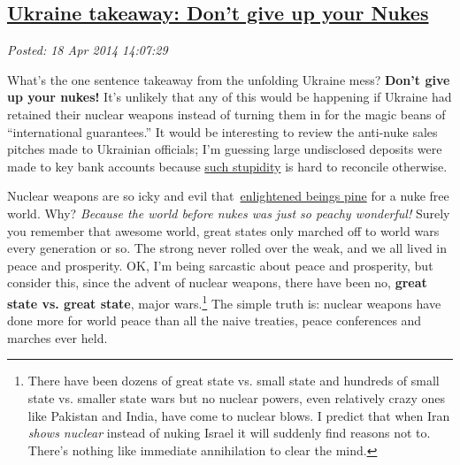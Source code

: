 %

\subsection*{\href{http://bakerjd99.wordpress.com/2014/04/18/ukraine-takeaway-dont-give-up-your-nukes/}{Ukraine takeaway: Don't give up your Nukes}}


\noindent\emph{Posted: 18 Apr 2014 14:07:29}
\vspace{6pt}

What's the one sentence takeaway from the unfolding Ukraine mess?
\textbf{Don't give up your nukes!} It's unlikely that any of
this would be happening if Ukraine had retained their nuclear weapons
instead of turning them in for the magic beans of ``international
guarantees.'' It would be interesting to review the anti-nuke sales
pitches made to Ukrainian officials; I'm guessing large undisclosed
deposits were made to key bank accounts because
\href{http://www.slate.com/blogs/the\_world\_/2014/03/19/the\_budapest\_memorandum\_in\_1994\_russia\_agreed\_to\_respect\_ukraine\_s\_borders.html}{such
stupidity} is hard to reconcile otherwise.

Nuclear weapons are so icky and evil
that~\href{http://blogs.telegraph.co.uk/news/nilegardiner/100002371/is-obama-the-most-naive-president-in-us-history/}{enlightened
beings pine} for a nuke free world. Why? \emph{Because the world before
nukes was just so peachy wonderful!} Surely you remember that awesome
world, great states only marched off to world wars every generation or
so. The strong never rolled over the weak, and we all lived in peace and
prosperity. OK, I'm being sarcastic about peace and prosperity, but
consider this, since the advent of nuclear weapons, there have been no,
\textbf{great state vs. great state}, major wars.\footnote{
There have been dozens of great state vs. small state and
hundreds of small state vs. smaller state wars but no nuclear powers,
even relatively crazy ones like Pakistan and India, have come to nuclear
blows. I predict that when Iran \emph{shows nuclear} instead of nuking
Israel it will suddenly find reasons not to. There's nothing like
immediate annihilation to clear the mind.
} 
 The simple
truth is: nuclear weapons have done more for world peace than all the
naive treaties, peace conferences and marches ever held.

